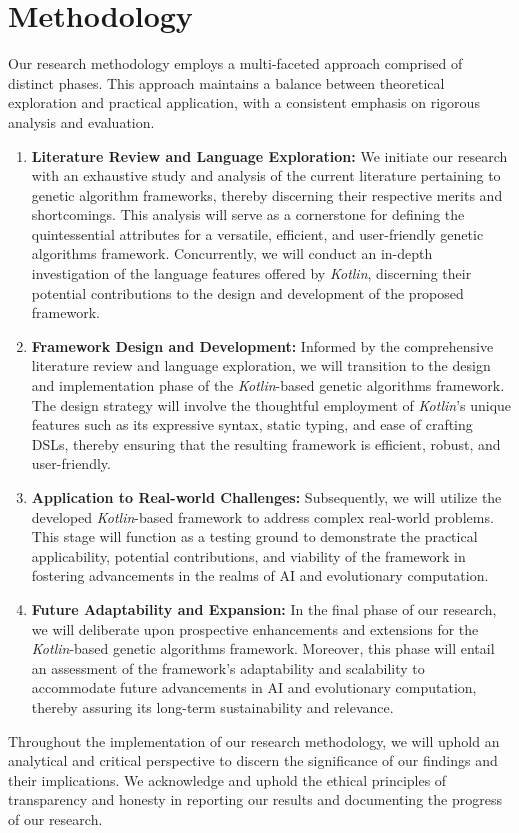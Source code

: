 \section{Methodology}
\label{sec:methodology}
  Our research methodology employs a multi-faceted approach comprised of distinct phases. This approach maintains a 
  balance between theoretical exploration and practical application, with a consistent emphasis on rigorous analysis 
  and evaluation.
  
  \begin{enumerate}
    \item \textbf{Literature Review and Language Exploration:} We initiate our research with an exhaustive study and 
      analysis of the current literature pertaining to genetic algorithm frameworks, thereby discerning their 
      respective merits and shortcomings. This analysis will serve as a cornerstone for defining the quintessential 
      attributes for a versatile, efficient, and user-friendly genetic algorithms framework. Concurrently, we will 
      conduct an in-depth investigation of the language features offered by \textit{Kotlin}, discerning their potential 
      contributions to the design and development of the proposed framework.
    \item \textbf{Framework Design and Development:} Informed by the comprehensive literature review and language 
      exploration, we will transition to the design and implementation phase of the \textit{Kotlin}-based genetic 
      algorithms framework. The design strategy will involve the thoughtful employment of \textit{Kotlin}'s unique 
      features such as its expressive syntax, static typing, and ease of crafting DSLs, thereby ensuring that the resulting framework is efficient, robust, and user-friendly.
    \item \textbf{Application to Real-world Challenges:} Subsequently, we will utilize the developed 
      \textit{Kotlin}-based framework to address complex real-world problems. This stage will function as a testing 
      ground to demonstrate the practical applicability, potential contributions, and viability of the framework in 
      fostering advancements in the realms of AI and evolutionary computation.
    \item \textbf{Future Adaptability and Expansion:} In the final phase of our research, we will deliberate upon 
      prospective enhancements and extensions for the \textit{Kotlin}-based genetic algorithms framework. Moreover, 
      this phase will entail an assessment of the framework's adaptability and scalability to accommodate future 
      advancements in AI and evolutionary computation, thereby assuring its long-term sustainability and relevance.
  \end{enumerate}

  Throughout the implementation of our research methodology, we will uphold an analytical and critical perspective to 
  discern the significance of our findings and their implications. We acknowledge and uphold the ethical principles of 
  transparency and honesty in reporting our results and documenting the progress of our research.
